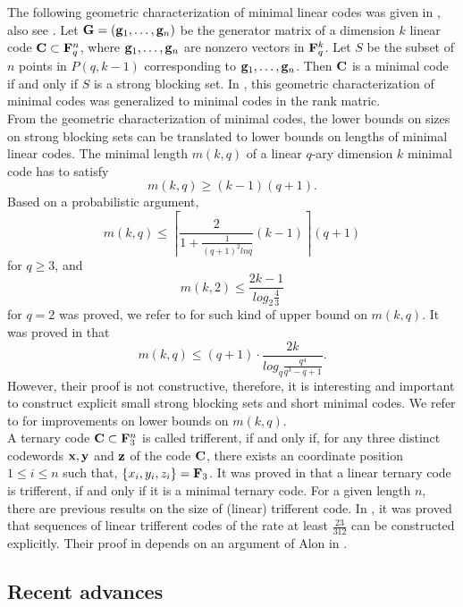 \documentclass[10pt,a4paper]{article}
\begin{document}
The following geometric characterization of minimal linear codes was given in \cite{Tang,Alfarano1}, also see \cite{Hegar,Alon}. Let ${\bf G}=({\bf g}_1,\ldots, {\bf g}_n)$ be the generator matrix of a dimension $k$ linear code ${\bf C} \subset {\bf F}_q^n$, where ${\bf g}_1, \ldots, {\bf g}_n$ are nonzero vectors in ${\bf F}_q^k$. Let $S$ be the subset of $n$ points in $P(q,k-1)$ corresponding to ${\bf g}_1, \ldots, {\bf g}_n$. Then ${\bf C}$ is a minimal code if and only if $S$ is a strong blocking set. In \cite{Alfarano2}, this geometric characterization of minimal codes was generalized to minimal codes in the rank matric.\\


From the geometric characterization of minimal codes, the lower bounds on sizes on strong blocking sets can be translated to lower bounds on lengths of minimal linear codes. The minimal length $m(k,q)$ of a linear $q$-ary dimension $k$ minimal code has to satisfy $$m(k,q) \geq (k-1)(q+1).$$ Based on a probabilistic argument, $$m(k,q) \leq \left\lceil \frac{2}{1+\frac{1}{(q+1)^2ln q}}(k-1)\right\rceil (q+1)$$ for $q \geq 3$, and $$m(k,2) \leq \frac{2k-1}{log_2\frac{4}{3}}$$ for $q=2$ was proved, we refer to \cite{Mik,Alfarano3,Bishnoi,Hegar} for such kind of upper bound on $m(k,q)$. It was proved in \cite{Bishnoi} that $$m(k,q) \leq (q+1) \cdot \frac{2k}{log_q\frac{q^4}{q^3-q+1}}.$$ However, their proof is not constructive, therefore, it is interesting and important to construct explicit small strong blocking sets and short minimal codes. We refer to \cite{Scotti} for improvements on lower bounds on $m(k,q)$. \\


A ternary code ${\bf C} \subset {\bf F}_3^n$ is called trifferent, if and only if, for any three distinct codewords ${\bf x}, {\bf y} $ and ${\bf z}$ of the code ${\bf C}$, there exists an coordinate position $1\leq i \leq n$ such that, $\{x_i,y_i,z_i\}={\bf F}_3$. It was proved in \cite{Bishnoi} that a linear ternary code is trifferent, if and only if it is a minimal ternary code. For a given length $n$, there are previous results on the size of (linear) trifferent code. In \cite[Theorem 1.7]{Bishnoi}, it was proved that sequences of linear trifferent codes of the rate at least $\frac{23}{312}$ can be constructed explicitly. Their proof in \cite{Bishnoi} depends on an argument of Alon in \cite{Alon1}.\\




\subsection{Recent advances}
\end{document}

